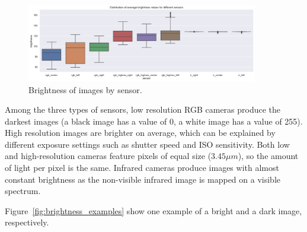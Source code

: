 \documentclass[Master,MDS,english]{BASE/twbook} %
\begin{document}
\begin{figure}[h]
\centering
\includegraphics[width=0.9\textwidth]{images/datasets/db/brightness}
\caption{Brightness of images by sensor. }
\label{fig:brightness}
\end{figure}


Among the three types of sensors, low resolution RGB cameras produce the darkest images (a black image has a value of 0, a white image has a value of 255). 
High resolution images are brighter on average, which can be explained by different exposure settings such as shutter speed and ISO sensitivity. Both low and high-resolution cameras feature pixels of equal size ($3.45 \mu m$), so the amount of light per pixel is the same.
Infrared cameras produce images with almost constant brightness as the non-visible infrared image is mapped on a visible spectrum.

Figure~\ref{fig:brightness_examples} show one example of a bright and a dark image, respectively.
\end{document}
